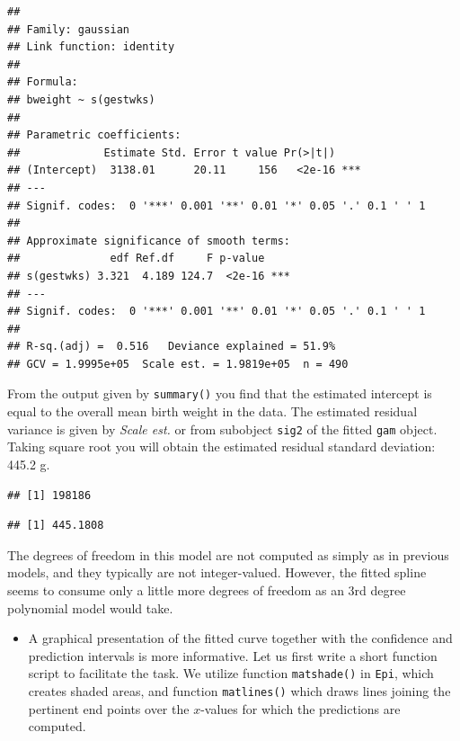 \documentclass[
]{book}
\newenvironment{Shaded}{\begin{snugshade}}{\end{snugshade}}
\newcommand{\FunctionTok}[1]{\textcolor[rgb]{0.13,0.29,0.53}{\textbf{#1}}}
\newcommand{\NormalTok}[1]{#1}
\newcommand{\SpecialCharTok}[1]{\textcolor[rgb]{0.81,0.36,0.00}{\textbf{#1}}}
\providecommand{\tightlist}{%
  \setlength{\itemsep}{0pt}\setlength{\parskip}{0pt}}
\begin{document}
\begin{verbatim}
## 
## Family: gaussian 
## Link function: identity 
## 
## Formula:
## bweight ~ s(gestwks)
## 
## Parametric coefficients:
##             Estimate Std. Error t value Pr(>|t|)    
## (Intercept)  3138.01      20.11     156   <2e-16 ***
## ---
## Signif. codes:  0 '***' 0.001 '**' 0.01 '*' 0.05 '.' 0.1 ' ' 1
## 
## Approximate significance of smooth terms:
##              edf Ref.df     F p-value    
## s(gestwks) 3.321  4.189 124.7  <2e-16 ***
## ---
## Signif. codes:  0 '***' 0.001 '**' 0.01 '*' 0.05 '.' 0.1 ' ' 1
## 
## R-sq.(adj) =  0.516   Deviance explained = 51.9%
## GCV = 1.9995e+05  Scale est. = 1.9819e+05  n = 490
\end{verbatim}

From the output given by \texttt{summary()} you find that the
estimated intercept is equal to the overall mean birth
weight in the data. The estimated residual variance is given by
\emph{Scale est.} or from subobject \texttt{sig2} of the fitted
\texttt{gam} object. Taking square root you will obtain the estimated
residual standard deviation: 445.2 g.

\begin{Shaded}
\end{Shaded}

\begin{verbatim}
## [1] 198186
\end{verbatim}

\begin{Shaded}
\end{Shaded}

\begin{verbatim}
## [1] 445.1808
\end{verbatim}

The degrees of freedom in this model are not computed as simply as in previous
models, and they typically are not integer-valued. However,
the fitted spline seems to consume only a little more degrees of freedom
as an 3rd degree polynomial model would take.

\begin{itemize}
\tightlist
\item
  A graphical presentation of the fitted curve together with the
  confidence and prediction intervals is more informative.
  Let us first write a
  short function script to facilitate the task. We utilize function \texttt{matshade()}
  in \texttt{Epi}, which creates shaded areas, and function \texttt{matlines()} which draws
  lines joining the pertinent end points over the \(x\)-values for which the
  predictions are computed.
\end{itemize}
\end{document}
